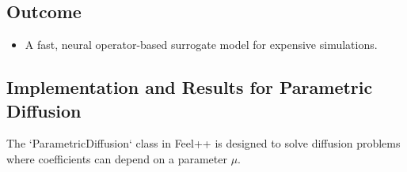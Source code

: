 \documentclass[12pt]{article}
\begin{document}
\subsection{Outcome}
\begin{itemize}
    \item A fast, neural operator-based surrogate model for expensive simulations.
\end{itemize}

\subsection{Implementation and Results for Parametric Diffusion}

The `ParametricDiffusion` class in Feel++ is designed to solve diffusion problems where coefficients can depend on a parameter $\mu$.
\end{document}
